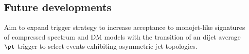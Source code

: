 





\subsection{Future developments}
Aim to expand trigger strategy to increase acceptance to monojet-like signatures of compressed spectrum and DM models with the transition of an dijet average $\pt$ trigger to select events exhibiting asymmetric jet topologies.








